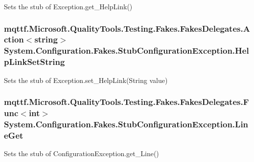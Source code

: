 Sets the stub of Exception.\-get\-\_\-\-Help\-Link()

\hypertarget{class_system_1_1_configuration_1_1_fakes_1_1_stub_configuration_exception_a377875ecb918bc62dfbba12fd66ba51a}{
\subsubsection[{Help\-Link\-Set\-String}]{\setlength{\rightskip}{0pt plus 5cm}mqttf.\-Microsoft.\-Quality\-Tools.\-Testing.\-Fakes.\-Fakes\-Delegates.\-Action$<$string$>$ System.\-Configuration.\-Fakes.\-Stub\-Configuration\-Exception.\-Help\-Link\-Set\-String}}\label{class_system_1_1_configuration_1_1_fakes_1_1_stub_configuration_exception_a377875ecb918bc62dfbba12fd66ba51a}


Sets the stub of Exception.\-set\-\_\-\-Help\-Link(\-String value)

\hypertarget{class_system_1_1_configuration_1_1_fakes_1_1_stub_configuration_exception_a9ee9667e25ce1b2e225aa576f1f2de66}{
\subsubsection[{Line\-Get}]{\setlength{\rightskip}{0pt plus 5cm}mqttf.\-Microsoft.\-Quality\-Tools.\-Testing.\-Fakes.\-Fakes\-Delegates.\-Func$<$int$>$ System.\-Configuration.\-Fakes.\-Stub\-Configuration\-Exception.\-Line\-Get}}\label{class_system_1_1_configuration_1_1_fakes_1_1_stub_configuration_exception_a9ee9667e25ce1b2e225aa576f1f2de66}


Sets the stub of Configuration\-Exception.\-get\-\_\-\-Line()

